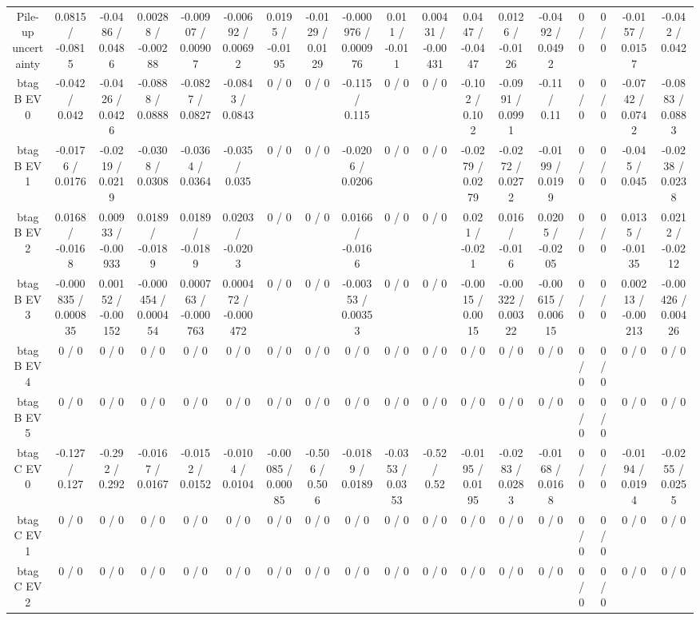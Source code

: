 \documentclass[10pt]{article}
\begin{document}
\begin{table}[htbp]
\begin{center}
\begin{tabular}{|c|c|c|c|c|c|c|c|c|c|c|c|c|c|c|c|c|c|}
  Pile-up uncertainty & 0.0815 / -0.0815 & -0.0486 / 0.0486 & 0.00288 / -0.00288 & -0.00907 / 0.00907 & -0.00692 / 0.00692 & 0.0195 / -0.0195 & -0.0129 / 0.0129 & -0.000976 / 0.000976 & 0.011 / -0.011 & 0.00431 / -0.00431 & 0.0447 / -0.0447 & 0.0126 / -0.0126 & -0.0492 / 0.0492 & 0 / 0 & 0 / 0 & -0.0157 / 0.0157 & -0.042 / 0.042 \\ 
  btag B EV 0 & -0.042 / 0.042 & -0.0426 / 0.0426 & -0.0888 / 0.0888 & -0.0827 / 0.0827 & -0.0843 / 0.0843 & 0 / 0 & 0 / 0 & -0.115 / 0.115 & 0 / 0 & 0 / 0 & -0.102 / 0.102 & -0.0991 / 0.0991 & -0.11 / 0.11 & 0 / 0 & 0 / 0 & -0.0742 / 0.0742 & -0.0883 / 0.0883 \\ 
  btag B EV 1 & -0.0176 / 0.0176 & -0.0219 / 0.0219 & -0.0308 / 0.0308 & -0.0364 / 0.0364 & -0.035 / 0.035 & 0 / 0 & 0 / 0 & -0.0206 / 0.0206 & 0 / 0 & 0 / 0 & -0.0279 / 0.0279 & -0.0272 / 0.0272 & -0.0199 / 0.0199 & 0 / 0 & 0 / 0 & -0.045 / 0.045 & -0.0238 / 0.0238 \\ 
  btag B EV 2 & 0.0168 / -0.0168 & 0.00933 / -0.00933 & 0.0189 / -0.0189 & 0.0189 / -0.0189 & 0.0203 / -0.0203 & 0 / 0 & 0 / 0 & 0.0166 / -0.0166 & 0 / 0 & 0 / 0 & 0.021 / -0.021 & 0.016 / -0.016 & 0.0205 / -0.0205 & 0 / 0 & 0 / 0 & 0.0135 / -0.0135 & 0.0212 / -0.0212 \\ 
  btag B EV 3 & -0.000835 / 0.000835 & 0.00152 / -0.00152 & -0.000454 / 0.000454 & 0.000763 / -0.000763 & 0.000472 / -0.000472 & 0 / 0 & 0 / 0 & -0.00353 / 0.00353 & 0 / 0 & 0 / 0 & -0.0015 / 0.0015 & -0.00322 / 0.00322 & -0.00615 / 0.00615 & 0 / 0 & 0 / 0 & 0.00213 / -0.00213 & -0.00426 / 0.00426 \\ 
  btag B EV 4 & 0 / 0 & 0 / 0 & 0 / 0 & 0 / 0 & 0 / 0 & 0 / 0 & 0 / 0 & 0 / 0 & 0 / 0 & 0 / 0 & 0 / 0 & 0 / 0 & 0 / 0 & 0 / 0 & 0 / 0 & 0 / 0 & 0 / 0 \\ 
  btag B EV 5 & 0 / 0 & 0 / 0 & 0 / 0 & 0 / 0 & 0 / 0 & 0 / 0 & 0 / 0 & 0 / 0 & 0 / 0 & 0 / 0 & 0 / 0 & 0 / 0 & 0 / 0 & 0 / 0 & 0 / 0 & 0 / 0 & 0 / 0 \\ 
  btag C EV 0 & -0.127 / 0.127 & -0.292 / 0.292 & -0.0167 / 0.0167 & -0.0152 / 0.0152 & -0.0104 / 0.0104 & -0.00085 / 0.00085 & -0.506 / 0.506 & -0.0189 / 0.0189 & -0.0353 / 0.0353 & -0.52 / 0.52 & -0.0195 / 0.0195 & -0.0283 / 0.0283 & -0.0168 / 0.0168 & 0 / 0 & 0 / 0 & -0.0194 / 0.0194 & -0.0255 / 0.0255 \\ 
  btag C EV 1 & 0 / 0 & 0 / 0 & 0 / 0 & 0 / 0 & 0 / 0 & 0 / 0 & 0 / 0 & 0 / 0 & 0 / 0 & 0 / 0 & 0 / 0 & 0 / 0 & 0 / 0 & 0 / 0 & 0 / 0 & 0 / 0 & 0 / 0 \\ 
  btag C EV 2 & 0 / 0 & 0 / 0 & 0 / 0 & 0 / 0 & 0 / 0 & 0 / 0 & 0 / 0 & 0 / 0 & 0 / 0 & 0 / 0 & 0 / 0 & 0 / 0 & 0 / 0 & 0 / 0 & 0 / 0 & 0 / 0 & 0 / 0 \\ 

\end{tabular}
\end{center}
\end{table}
\end{document}
